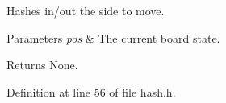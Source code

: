 Hashes in/out the side to move. 


\begin{DoxyParams}{Parameters}
{\em pos} & The current board state. \\
\hline
\end{DoxyParams}
\begin{DoxyReturn}{Returns}
None. 
\end{DoxyReturn}


Definition at line 56 of file hash.\+h.

